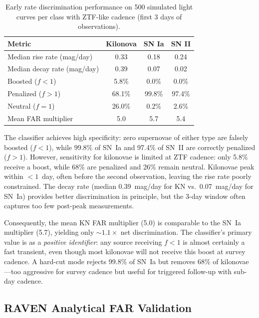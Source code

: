 \documentclass[twocolumn]{article}
\begin{document}
\begin{table}[htbp]
\centering
\caption{Early rate discrimination performance on 500 simulated light curves per class with ZTF-like cadence (first 3 days of observations). \label{tab:earlyrate_results}}
\begin{tabular}{lccc}
\toprule
Metric & Kilonova & SN Ia & SN II \\
\midrule
Median rise rate (mag/day)    & 0.33 & 0.18 & 0.24 \\
Median decay rate (mag/day)   & 0.39 & 0.07 & 0.02 \\
Boosted ($f < 1$)             & 5.8\%  & 0.0\% & 0.0\% \\
Penalized ($f > 1$)           & 68.1\% & 99.8\% & 97.4\% \\
Neutral ($f = 1$)             & 26.0\% & 0.2\% & 2.6\% \\
Mean FAR multiplier           & 5.0  & 5.7  & 5.4 \\
\bottomrule
\end{tabular}
\end{table}

The classifier achieves high specificity: zero supernovae of either type are falsely boosted ($f < 1$), while 99.8\% of SN~Ia and 97.4\% of SN~II are correctly penalized ($f > 1$). However, sensitivity for kilonovae is limited at ZTF cadence: only 5.8\% receive a boost, while 68\% are penalized and 26\% remain neutral. Kilonovae peak within $<1$~day, often before the second observation, leaving the rise rate poorly constrained. The decay rate (median 0.39~mag/day for KN vs.\ 0.07~mag/day for SN~Ia) provides better discrimination in principle, but the 3-day window often captures too few post-peak measurements.

Consequently, the mean KN FAR multiplier (5.0) is comparable to the SN~Ia multiplier (5.7), yielding only ${\sim}1.1\times$ net discrimination. The classifier's primary value is as a \emph{positive identifier}: any source receiving $f < 1$ is almost certainly a fast transient, even though most kilonovae will not receive this boost at survey cadence. A hard-cut mode rejects 99.8\% of SN~Ia but removes 68\% of kilonovae---too aggressive for survey cadence but useful for triggered follow-up with sub-day cadence.

\subsection{RAVEN Analytical FAR Validation} \label{sec:raven_validation}
\end{document}

